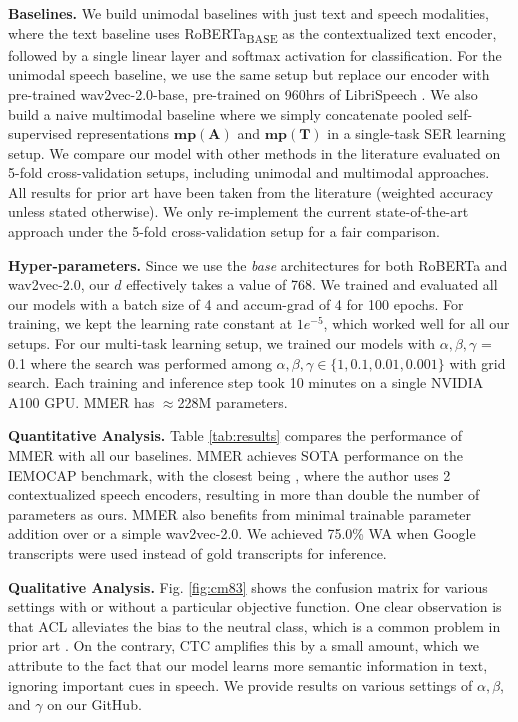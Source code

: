 \documentclass{INTERSPEECH2023}
\begin{document}
{\noindent \textbf{Baselines.}} We build unimodal baselines with just text and speech modalities, where the text baseline uses RoBERTa\textsubscript{BASE} as the contextualized text encoder, followed by a single linear layer and softmax activation for classification. For the unimodal speech baseline, we use the same setup but replace our encoder with pre-trained wav2vec-2.0-base, pre-trained on 960hrs of LibriSpeech \cite{panayotov2015librispeech}. We also build a naive multimodal baseline where we simply concatenate pooled self-supervised representations $\mathbf{mp}(\mathbf{A})$ and $\mathbf{mp}(\mathbf{T})$ in a single-task SER learning setup. We compare our model with other methods in the literature evaluated on 5-fold cross-validation setups, including unimodal and multimodal approaches. All results for prior art have been taken from the literature (weighted accuracy unless stated otherwise). We only re-implement the current state-of-the-art approach \cite{cai2021speech} under the 5-fold cross-validation setup for a fair comparison.
\vspace{1mm}




{\noindent \textbf{Hyper-parameters.}} Since we use the \emph{base} architectures for both RoBERTa and wav2vec-2.0, our $d$ effectively takes a value of 768. We trained and evaluated all our models with a batch size of 4 and accum-grad of 4 for 100 epochs. For training, we kept the learning rate constant at $1e^{-5}$, which worked well for all our setups. For our multi-task learning setup, we trained our models with $\alpha,\beta,\gamma$ = 0.1 where the search was performed among $\alpha,\beta,\gamma \in \{1,0.1,0.01,0.001\}$ with grid search. Each training and inference step took 10 minutes on a single NVIDIA A100 GPU. MMER has $\approx$228M parameters.
\vspace{1mm}

{\noindent \textbf{Quantitative Analysis.}} Table \ref{tab:results} compares the performance of MMER with all our baselines. MMER achieves SOTA performance on the IEMOCAP benchmark, with the closest being \cite{morais_self}, where the author uses 2 contextualized speech encoders, resulting in more than double the number of parameters as ours. MMER also benefits from minimal trainable parameter addition over \cite{cai2021speech} or a simple wav2vec-2.0. We achieved 75.0\% WA when Google transcripts were used instead of gold transcripts for inference.
\vspace{1mm}

{\noindent \textbf{Qualitative Analysis.}} Fig. \ref{fig:cm83} shows the confusion matrix for various settings with or without a particular objective function. One clear observation is that ACL alleviates the bias to the neutral class, which is a common problem in prior art \cite{keysparse}. On the contrary, CTC amplifies this by a small amount, which we attribute to the fact that our model learns more semantic information in text, ignoring important cues in speech. We provide results on various settings of $\alpha,\beta$, and $\gamma$ on our GitHub.
\end{document}
